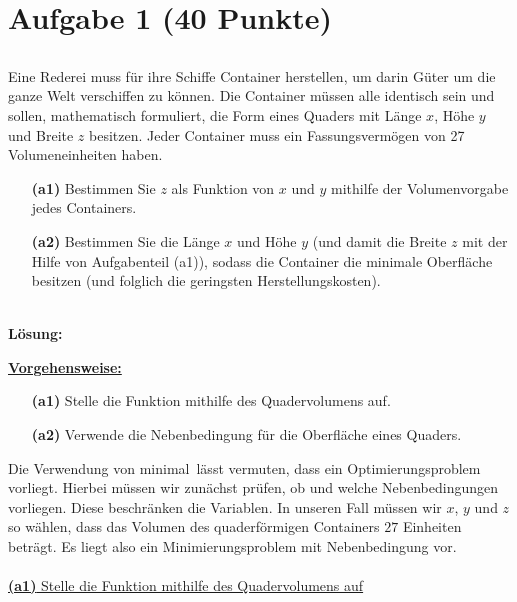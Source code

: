 \vspace{1cm}
\renewcommand{\labelenumi}{\theenumi.}
\section*{Aufgabe 1 (40 Punkte)}
\vspace{0.4cm}
\subsection*{}
Eine Rederei muss für ihre Schiffe Container herstellen, um darin Güter um die ganze Welt verschiffen zu können. Die Container müssen alle identisch sein und sollen, mathematisch formuliert, die Form eines Quaders  mit Länge $ x $, Höhe $ y $ und Breite $ z $ besitzen. Jeder Container muss ein Fassungsvermögen von 27 Volumeneinheiten haben. 
\begin{enumerate}
	\item[\textbf{(a1)}]
	Bestimmen Sie $ z $ als Funktion von $ x $ und $ y $ mithilfe der Volumenvorgabe jedes Containers.
	\item[\textbf{(a2)}] 
	Bestimmen Sie die Länge $ x $ und Höhe $ y $ (und damit die Breite $ z $ mit der Hilfe von Aufgabenteil (a1)), sodass die Container die minimale Oberfläche besitzen (und folglich die geringsten Herstellungskosten).
\end{enumerate}
\ \\
\textbf{Lösung:}
\begin{mdframed}
\underline{\textbf{Vorgehensweise:}}
\renewcommand{\labelenumi}{\theenumi.}
\begin{enumerate}
\item[\textbf{(a1)}] Stelle die Funktion mithilfe des Quadervolumens auf.
\item[\textbf{(a2)}] Verwende die Nebenbedingung für die Oberfläche eines Quaders.
\end{enumerate}
\end{mdframed}
Die Verwendung von \glqq minimal\grqq \ lässt vermuten, dass ein Optimierungsproblem vorliegt.
Hierbei müssen wir zunächst prüfen, ob und welche Nebenbedingungen vorliegen. Diese beschränken die Variablen. In unseren Fall müssen wir $ x $,  $ y $ und $ z $ so wählen, dass das Volumen des quaderförmigen Containers $ 27 $ Einheiten beträgt.
Es liegt also ein Minimierungsproblem mit Nebenbedingung vor.\\
\\
\underline{\textbf{(a1)} Stelle die Funktion mithilfe des Quadervolumens auf }\\
